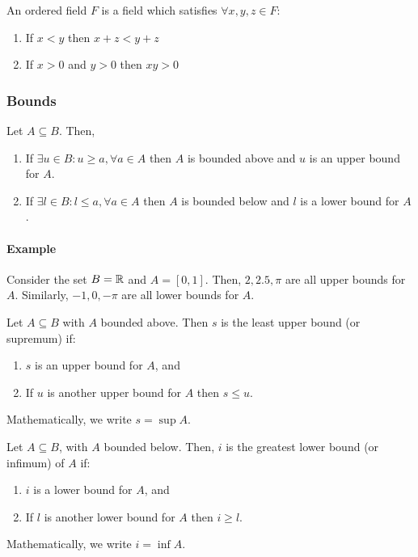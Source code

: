 \begin{definition}
    An ordered field $F$ is a field which satisfies $\forall x, y, z \in F$:
    \begin{enumerate}
        \item If $x < y$ then $x + z < y + z$
        \item If $x > 0$ and $y > 0$ then $xy > 0$ 
    \end{enumerate}
\end{definition}

\subsubsection{Bounds}

\begin{definition}[Bounds]
    Let $A \subseteq B$. Then,
    \begin{enumerate}
        \item If $\exists u \in B: u \geq a, \forall a \in A$ then $A$ is bounded above and $u$ is an upper bound for $A$.
        \item If $\exists l \in B: l \leq a, \forall a \in A$ then $A$ is bounded below and $l$ is a lower bound for $A$.
    \end{enumerate}
\end{definition}

\paragraph{Example}
Consider the set $B = \mathbb{R}$ and $A = [0,1]$. Then, $2, 2.5, \pi$ are all upper bounds for $A$. Similarly, $-1, 0, -\pi$ are all lower bounds for $A$.  

\begin{definition}[Supremum]
    Let $A \subseteq B$ with $A$ bounded above. Then $s$ is the least upper bound (or supremum) if:
    \begin{enumerate}
        \item $s$ is an upper bound for $A$, and
        \item If $u$ is another upper bound for $A$ then $s \leq u$.
    \end{enumerate}
    Mathematically, we write $s = \sup A$.
\end{definition}

\begin{definition}[Infimum]
    Let $A \subseteq B$, with $A$ bounded below. Then, $i$ is the greatest lower bound (or infimum) of $A$ if:
    \begin{enumerate}
        \item $i$ is a lower bound for $A$, and
        \item If $l$ is another lower bound for $A$ then $i \geq l$.
    \end{enumerate}
    Mathematically, we write $i = \inf A$.
\end{definition}

